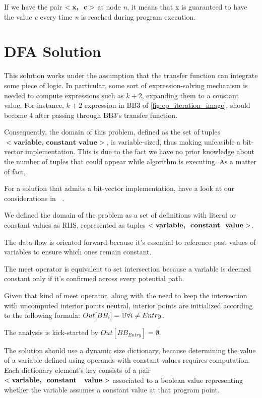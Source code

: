 \documentclass[a4paper,12pt,numbers=noenddot]{scrreprt}
\begin{document}
        If we have the pair $<\textbf{x,\; c}>$ at node \textit{n}, it means that x is guaranteed to have the value \textit{c} every time \textit{n} is reached during program execution.

    
    \section*{DFA Solution}

        This solution works under the assumption that the transfer function can integrate some piece of logic. In particular, some sort of expression-solving mechanism is needed to compute expressions such as $k+2$, expanding them to a constant value. For instance, $k+2$ expression in BB3 of \ref{fig:cp_iteration_image}, should become $4$ after passing through BB3's transfer function.

        Consequently, the domain of this problem, defined as the set of tuples $<\textbf{variable, constant value}>$, is variable-sized, thus making unfeasible a bit-vector implementation. This is due to the fact we have no prior knowledge about the number of tuples that could appear while algorithm is executing. As a matter of fact, 

        For a solution that admits a bit-vector implementation, have a look at our considerations in \textbf{~}.
        
        We defined the domain of the problem as a set of definitions with literal or constant values as RHS, represented as tuples $<\textbf{variable, \;constant \;value}>$.
        
        
        The data flow is oriented forward because it's essential to reference past values of variables to ensure which ones remain constant.
        
        The meet operator is equivalent to set intersection because a variable is deemed constant only if it's confirmed across every potential path.
        
        Given that kind of meet operator, along with the need to keep the intersection with uncomputed interior points neutral, interior points are initialized according to the following formula: $Out[BB_i] = \mathbb{U} \space \forall i \neq Entry$.
        
         The analysis is kick-started by $Out[BB_{Entry}] = \emptyset$.

         The solution should use a dynamic size dictionary, because determining the value of a variable defined using operands with constant values requires computation. Each dictionary element's key consists of a pair $<\textbf{variable,\; constant \; value}>$ associated to a boolean value representing whether the variable assumes a constant value at that program point.
\end{document}
